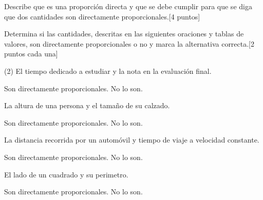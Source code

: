 \documentclass[sin curso]{plantilla-evaluacion-v1}
\begin{document}
\begin{partes}
  \parte Describe que es una proporción directa y que se debe cumplir para
  que se diga que dos cantidades son directamente proporcionales.\hfill [4 puntos]
  \begin{respuesta}[height=3.5cm]
  \end{respuesta}
  \parte Determina si las cantidades, descritas en las siguientes oraciones y 
  tablas de valores, son directamente proporcionales o no y marca la alternativa
  correcta.\hfill[2 puntos cada una]
  \begin{ejercicios}(2)
    \ejercicio El tiempo dedicado a estudiar y la nota en la evaluación final.
    \begin{vertical}
      \alternativa Son directamente proporcionales.
      \alternativa No lo son.
    \end{vertical}
    \ejercicio La altura de una persona y el tamaño de su calzado.
    \begin{vertical}
      \alternativa Son directamente proporcionales.
      \alternativa No lo son.
    \end{vertical}
    \ejercicio La distancia recorrida por un automóvil y tiempo de viaje
    a velocidad constante.
    \begin{vertical}
      \alternativa Son directamente proporcionales.
      \alternativa No lo son.
    \end{vertical}
    \ejercicio El lado de un cuadrado y su perimetro.
    \begin{vertical}
      \alternativa Son directamente proporcionales.
      \alternativa No lo son.
    \end{vertical}


\end{ejercicios}
\end{partes}
\end{document}
